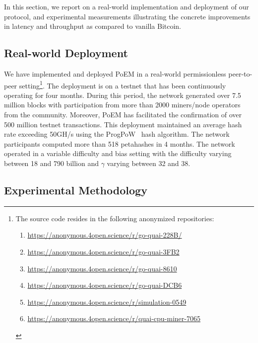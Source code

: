 In this section, we report on a real-world implementation and deployment of our
protocol, and experimental measurements illustrating the concrete improvements
in latency and throughput as compared to vanilla Bitcoin.

\subsection{Real-world Deployment}\label{sec:deployment}

We have implemented and deployed PoEM in a real-world permissionless peer-to-peer
setting\footnote{
    The source code resides in the following anonymized repositories:
    \begin{enumerate}
        \item \url{https://anonymous.4open.science/r/go-quai-228B/}
        \item \url{https://anonymous.4open.science/r/go-quai-3FB2}
        \item \url{https://anonymous.4open.science/r/go-quai-8610}
        \item \url{https://anonymous.4open.science/r/go-quai-DCB6}
        \item \url{https://anonymous.4open.science/r/simulation-0549}
        \item \url{https://anonymous.4open.science/r/quai-cpu-miner-7065}
    \end{enumerate}
}.
The deployment is on a testnet that has been continuously operating for
four months. During this period, the network generated over 7.5 million blocks
with participation from
more than 2000 miners/node operators from the community. Moreover, PoEM has facilitated the
confirmation of over 500 million testnet transactions. This deployment maintained an
average hash rate exceeding 50GH/s using the ProgPoW~\cite{progpow} hash algorithm.
The network participants computed more than 518 petahashes in 4 months.
The network operated in a variable difficulty and bias setting with the difficulty
varying between 18 and 790 billion and $\gamma$ varying between 32 and 38.

\subsection{Experimental Methodology}

